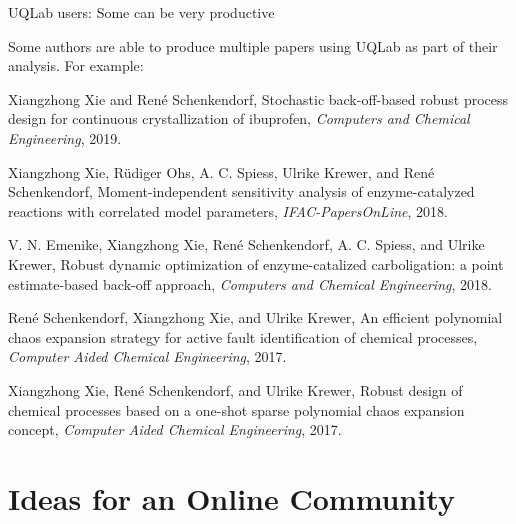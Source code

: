 \documentclass[]{rsuqbeamernew}
\begin{document}
\begin{frame}[t]{UQLab users: Some can be very productive}
  
Some authors are able to produce multiple papers using UQLab as part of their analysis.
For example:

  \begin{thebibliography}{Dijkstra, 1982}
    \footnotesize{
    Xiangzhong Xie and Ren\'e Schenkendorf,
    \newblock Stochastic back-off-based robust process design for continuous crystallization of ibuprofen, {\em Computers and Chemical Engineering}, 2019.
    
    Xiangzhong Xie, R\"udiger Ohs, A. C. Spiess, Ulrike Krewer, and Ren\'e Schenkendorf,
    \newblock Moment-independent sensitivity analysis of enzyme-catalyzed reactions with correlated model parameters, {\em IFAC-PapersOnLine}, 2018.
    
    V. N. Emenike, Xiangzhong Xie, Ren\'e Schenkendorf, A. C. Spiess, and Ulrike Krewer,
    \newblock Robust dynamic optimization of enzyme-catalized carboligation: a point estimate-based back-off approach, {\em Computers and Chemical Engineering}, 2018.
  
    Ren\'e Schenkendorf, Xiangzhong Xie, and Ulrike Krewer,
    \newblock An efficient polynomial chaos expansion strategy for active fault identification of chemical processes, {\em Computer Aided Chemical Engineering}, 2017.

    Xiangzhong Xie, Ren\'e Schenkendorf, and Ulrike Krewer,
    \newblock Robust design of chemical processes based on a one-shot sparse polynomial chaos expansion concept, {\em Computer Aided Chemical Engineering}, 2017.}
  \end{thebibliography}
\end{frame}

\section{Ideas for an Online Community}
\end{document}
